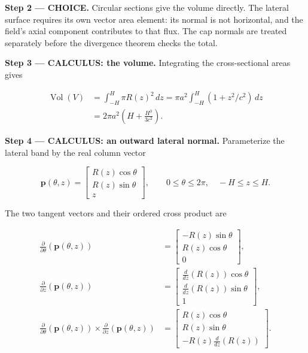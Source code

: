 \documentclass[11pt,oneside,openany]{book}
\begin{document}
\begin{ChoiceStep}
\textbf{Step 2 --- CHOICE.} Circular sections give the volume directly. The lateral surface requires its own vector area element: its normal is not horizontal, and the field's axial component contributes to that flux. The cap normals are treated separately before the divergence theorem checks the total.

\end{ChoiceStep}
\textbf{Step 3 --- CALCULUS: the volume.} Integrating the cross-sectional areas gives

\[
\begin{aligned}
\operatorname{Vol}(V)
&=\int_{-H}^{H}\pi R(z)^2\,dz
=\pi a^2\int_{-H}^{H}(1+z^2/c^2)\,dz\\
&=2\pi a^2\left(H+\frac{H^3}{3c^2}\right).
\end{aligned}
\]

\textbf{Step 4 --- CALCULUS: an outward lateral normal.} Parameterize the lateral band by the real column vector

\[
\mathbf p(\theta,z)=\begin{bmatrix}R(z)\cos\theta\\R(z)\sin\theta\\z\end{bmatrix},
\qquad 0\le\theta\le2\pi,\quad -H\le z\le H.
\]

The two tangent vectors and their ordered cross product are

\[
\begin{aligned}
\frac{\partial}{\partial\theta}(\mathbf p(\theta,z))
&=\begin{bmatrix}-R(z)\sin\theta\\R(z)\cos\theta\\0\end{bmatrix},\\
\frac{\partial}{\partial z}(\mathbf p(\theta,z))
&=\begin{bmatrix}\frac{d}{dz}(R(z))\cos\theta\\\frac{d}{dz}(R(z))\sin\theta\\1\end{bmatrix},\\
\frac{\partial}{\partial\theta}(\mathbf p(\theta,z))\mathbin\times
\frac{\partial}{\partial z}(\mathbf p(\theta,z))
&=\begin{bmatrix}R(z)\cos\theta\\R(z)\sin\theta\\-R(z)\frac{d}{dz}(R(z))\end{bmatrix}.
\end{aligned}
\]
\end{document}
